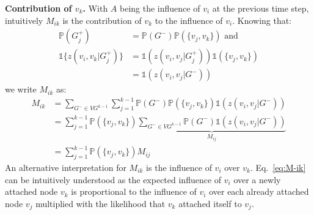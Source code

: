 

\textbf{Contribution of $v_k$.}
With $A$ being the influence of $v_i$ at the previous time step, intuitively $M_{ik}$ is the contribution of $v_k$ to the influence of $v_i$.
Knowing that:
\begin{align*}
	\mathds{P}(G_j^+) &= \mathds{P}(G^-)\mathds{P}(\{v_j,v_k\}) \text{ and } \\
	\mathds{1}\{z(v_i,v_k|G_j^+)\} &= \mathds{1}(z(v_i,v_j|G^+_j)) \mathds{1}(\{v_j,v_k\}) \\
	 &= \mathds{1}(z(v_i,v_j|G^-))
\end{align*}
we write $M_{ik}$ as:
%
\begin{align}
	M_{ik} &= \sum_{G^- \in {VG^{k-1}}} \sum^{k-1}_{j=1} \mathds{P}(G^-)\mathds{P}(\{v_j,v_k\}) \mathds{1}(z(v_i,v_j|G^-)) \nonumber \\
           &= \sum^{k-1}_{j=1} \mathds{P}(\{v_j,v_k\}) \underbrace{ \sum_{G^- \in {VG^{k-1}}} \mathds{P}(G^-) \mathds{1}(z(v_i,v_j|G^-))}_{M_{ij}} \nonumber \\  
		   &= \sum^{k-1}_{j=1} \mathds{P}(\{v_j,v_k\}) M_{ij} \label{eq:M-ik}
\end{align}
An alternative interpretation for $M_{ik}$ is the influence of $v_i$ over $v_k$.
Eq.~\eqref{eq:M-ik} can be intuitively understood as the expected influence of $v_i$ over a newly attached node $v_k$ is proportional to the influence of $v_i$ over each already attached node $v_j$ multiplied with the likelihood that $v_k$ attached itself to $v_j$.
